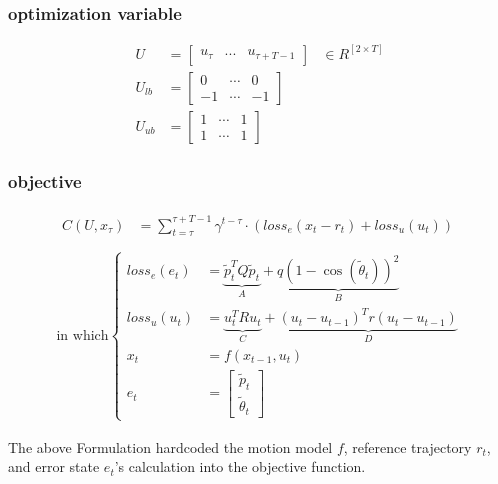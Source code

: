 \documentclass[conference]{IEEEtran}
\begin{document}
\subsubsection{optimization variable}
\[
\begin{aligned}
U&=\left[ \begin{matrix}u_{\tau }&...&u_{\tau +T-1}\end{matrix}  \right] &\in R^{[2\times T]}\\ 
U_{lb}&=\left[ \begin{matrix}0&\cdots &0\\ -1&\cdots &-1\end{matrix}  \right] \\ 
U_{ub}&=\left[ \begin{matrix}1&\cdots &1\\ 1&\cdots &1\end{matrix}  \right] 
\end{aligned} 
\]

\subsubsection{objective}
\[
\begin{gathered}
\begin{aligned}
C(U, x_\tau)
    &=\sum^{\tau +T-1}_{t=\tau } \gamma^{t-\tau } \cdot \left(loss_{e}\left( x_{t}-r_{t} \right) +loss_{u}\left( u_{t} \right)  \right) \\
\end{aligned}
\\ 
\text{in which} \left\{\begin{aligned}
loss_{e}(e_{t})
    &=\underbrace{\tilde{p}^{T}_{t}Q\tilde{p}_{t}}_{A} 
    +\underbrace{q\left( 1-\cos \left( \tilde{\theta}_{t}  \right)  \right)^{2} }_{B} \\ 
loss_{u}(u_{t})
    &=\underbrace{u^{T}_{t}Ru_{t}}_{C} 
    +\underbrace{\left( u_{t}-u_{t-1} \right)^{T} r\left( u_{t}-u_{t-1} \right) }_{D} \\
x_{t}&=f(x_{t-1},u_{t})\\ 
e_{t}&=\left[ \begin{gathered}\tilde{p}_{t}\\ \tilde{\theta}_{t} \end{gathered}  \right]
\end{aligned} \right.
\end{gathered}
\]

The above Formulation hardcoded the motion model $f$, reference trajectory $r_t$,
and error state $e_t$'s calculation into the objective function. 
\end{document}
